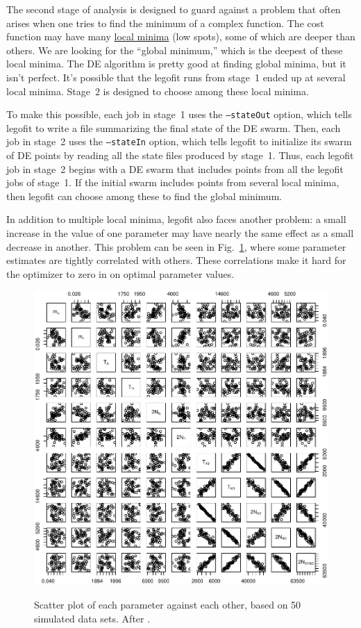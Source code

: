 \documentclass[11pt]{article}
\begin{document}
The second stage of analysis is designed to guard against a problem
that often arises when one tries to find the minimum of a complex
function. The cost function may have many
\href{https://en.wikipedia.org/wiki/Maxima_and_minima}{local minima}
(low spots), some of which are deeper than others. We are looking for
the ``global minimum,'' which is the deepest of these local
minima. The DE algorithm is pretty good at finding global minima, but
it isn't perfect. It's possible that the legofit runs from stage~1
ended up at several local minima. Stage~2 is designed to choose among
these local minima.

To make this possible, each job in stage~1 uses the
\texttt{--stateOut} option, which tells legofit to write a file
summarizing the final state of the DE swarm. Then, each job in
stage~2 uses the \texttt{--stateIn} option, which tells legofit to
initialize its swarm of DE points by reading all the state files
produced by stage~1. Thus, each legofit job in stage~2 begins with a
DE swarm that includes points from all the legofit jobs of stage~1. If
the initial swarm includes points from several local minima, then
legofit can choose among these to find the global minimum.

In addition to multiple local minima, legofit also faces another
problem: a small increase in the value of one parameter may have
nearly the same effect as a small decrease in another. This problem
can be seen in Fig.~\ref{fig.pairs}, where some parameter estimates
are tightly correlated with others. These correlations make it hard
for the optimizer to zero in on optimal parameter values.

\begin{figure}
  {\centering
    \includegraphics[width=\linewidth]{detpairs.pdf}\\}
  \caption{Scatter plot of each parameter against each other, based on
    50 simulated data sets. After \citet[Fig.~3]{Rogers:PCJ-2-e32}.}
  \label{fig.pairs}
\end{figure}
\end{document}
